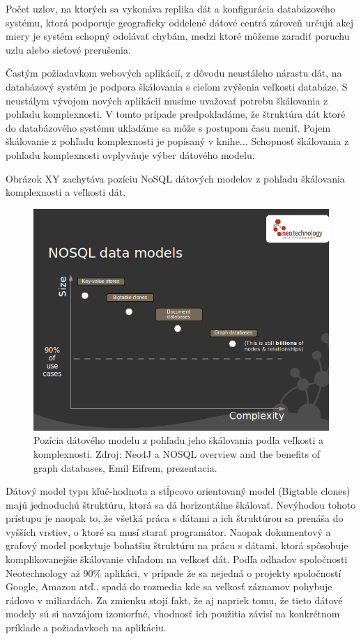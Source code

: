 \documentclass[11pt,twoside,a4paper]{book}
\begin{document}
Počet uzlov, na ktorých sa vykonáva replika dát a konfigurácia databázového systému, ktorá podporuje geograficky oddelené dátové centrá zároveň určujú akej miery je systém schopný odolávať chybám, medzi ktoré môžeme zaradiť poruchu uzlu alebo sieťové prerušenia.

Častým požiadavkom webových aplikácií, z dôvodu neustáleho nárastu dát, na databázový systém je podpora škálovania s cieľom zvýšenia veľkosti databáze. S neustálym vývojom nových aplikácií musíme uvažovať potrebu škálovania z pohľadu komplexnosti. V tomto prípade predpokladáme, že štruktúra dát ktoré do databázového systému ukladáme sa môže s postupom času meniť. Pojem škálovanie z pohľadu komplexnosti je popísaný v knihe... Schopnosť škálovania z pohľadu komplexnosti ovplyvňuje výber dátového modelu.

Obrázok XY zachytáva pozíciu NoSQL dátových modelov z pohľadu škálovania komplexnosti a veľkosti dát.

\begin{figure}[h]
 \centering
 \includegraphics[width=16cm]{./figures/nosqldatamodels.png}
 \caption{Pozícia dátového modelu z pohľadu jeho škálovania podľa veľkosti a komplexnosti. Zdroj: Neo4J a NOSQL overview and the benefits of graph databases, Emil Eifrem, prezentacia.}
 \label{fig:scalling}
\end{figure}

Dátový model typu kľuč-hodnota a stĺpcovo orientovaný model (Bigtable clones) majú jednoduchú štruktúru, ktorá sa dá horizontálne škálovať. Nevýhodou tohoto prístupu je naopak to, že všetká práca s dátami a ich štruktúrou sa prenáša do vyšších vrstiev, o ktoré sa musí starať programátor. Naopak dokumentový a grafový model poskytuje bohatšiu štruktúru na prácu s dátami, ktorá spôsobuje komplikovanejšie škálovanie vhľadom na veľkosť dát. Podľa odhadov spoločnosti Neotechnology až 90\% aplikáci, v prípade že sa nejedná o projekty spoločností Google, Amazon atď., spadá do rozmedia kde sa veľkosť záznamov pohybuje rádovo v miliardách. Za zmienku stojí fakt, že aj napriek tomu, že tieto dátové modely sú si navzájom izomorfné, vhodnosť ich použitia závisí na konkrétnom príklade a požiadavkoch na aplikáciu. 
\end{document}
